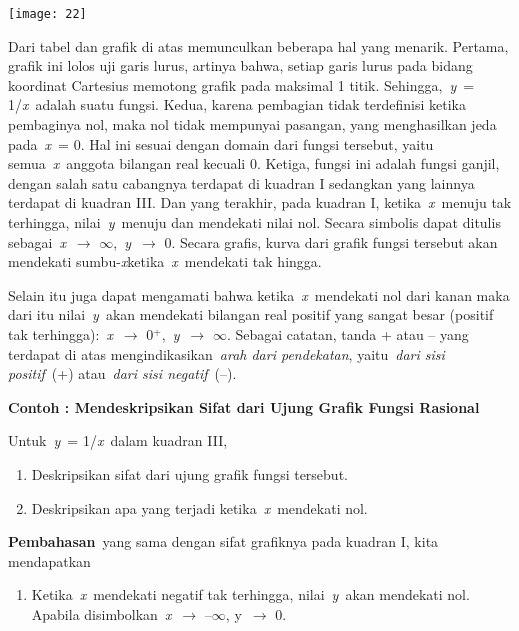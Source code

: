 \documentclass[11pt,fleqn]{book} %
\begin{document}
\begin{myEnumerate}
\begin{itemize}
\begin{center}
\texttt{[image: 22]}
\end{center}

Dari tabel dan grafik di atas memunculkan beberapa hal yang menarik. Pertama, grafik ini lolos uji garis lurus, artinya bahwa, setiap garis lurus pada bidang koordinat Cartesius memotong grafik pada maksimal 1 titik. Sehingga,~\textit{y}~= 1/\textit{x}~adalah suatu fungsi. Kedua, karena pembagian tidak terdefinisi ketika pembaginya nol, maka nol tidak mempunyai pasangan, yang menghasilkan jeda pada~\textit{x}~= 0. Hal ini sesuai dengan domain dari fungsi tersebut, yaitu semua~\textit{x}~anggota bilangan real kecuali 0. Ketiga, fungsi ini adalah fungsi ganjil, dengan salah satu cabangnya terdapat di kuadran I sedangkan yang lainnya terdapat di kuadran III. Dan yang terakhir, pada kuadran I, ketika~\textit{x}~menuju tak terhingga, nilai~\textit{y}~menuju dan mendekati nilai nol. Secara simbolis dapat ditulis sebagai~\textit{x}~$\mathrm{\to}$ $\mathrm{\infty}$,~\textit{y}~$\mathrm{\to}$ 0. Secara grafis, kurva dari grafik fungsi tersebut akan mendekati sumbu-\textit{x}ketika~\textit{x}~mendekati tak hingga.

Selain itu juga dapat mengamati bahwa ketika~\textit{x}~mendekati nol dari kanan maka dari itu nilai~\textit{y}~akan mendekati bilangan real positif yang sangat besar (positif tak terhingga):~\textit{x}~$\mathrm{\to}$ 0${}^{+}$,~\textit{y}~$\mathrm{\to}$ $\mathrm{\infty}$. Sebagai catatan, tanda + atau -- yang terdapat di atas mengindikasikan~\textit{arah dari pendekatan}, yaitu~\textit{dari sisi positif}~(+) atau~\textit{dari sisi negatif}~(--).

\noindent \textbf{Contoh : Mendeskripsikan Sifat dari Ujung Grafik Fungsi Rasional}

\noindent Untuk~\textit{y}~= 1/\textit{x}~dalam kuadran III,

\begin{enumerate}
\item  Deskripsikan sifat dari ujung grafik fungsi tersebut.

\item  Deskripsikan apa yang terjadi ketika~\textit{x}~mendekati nol.
\end{enumerate}

\noindent \textbf{Pembahasan}~yang sama dengan sifat grafiknya pada kuadran I, kita mendapatkan

\begin{enumerate}
\item  Ketika~\textit{x}~mendekati negatif tak terhingga, nilai~\textit{y}~akan mendekati nol. Apabila disimbolkan~\textit{x}~$\mathrm{\to}$ --$\mathrm{\infty}$, y~$\mathrm{\to}$ 0.


\end{enumerate}
\end{itemize}
\end{myEnumerate}
\end{document}
